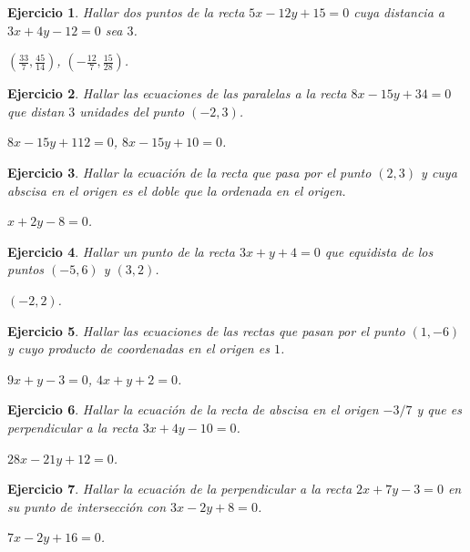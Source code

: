 \documentclass[12pt,a4paper]{article}
\newtheorem{ex}{Ejercicio}
\begin{document}
\begin{itemize}
\begin{ex}
Hallar dos puntos de la recta $5x - 12y + 15 = 0$ cuya distancia a $3x + 4y - 12 = 0$ sea $3$.
\begin{sol} $\left(\frac{33}{7}, \frac{45}{14}\right)$, $\left(-\frac{12}{7}, \frac{15}{28}\right)$. \end{sol}
\end{ex}

\begin{ex}
Hallar las ecuaciones de las paralelas a la recta $8x - 15y + 34 = 0$ que distan $3$ unidades del punto $(-2, 3)$.
\begin{sol} $8x - 15y + 112 = 0$, $8x - 15y + 10 = 0$. \end{sol}
\end{ex}

\begin{ex}
Hallar la ecuación de la recta que pasa por el punto $(2, 3)$ y cuya abscisa en el origen es el doble que la ordenada en el origen.
\begin{sol} $x + 2y - 8 = 0$. \end{sol}
\end{ex}

\begin{ex}
Hallar un punto de la recta $3x + y + 4 = 0$ que equidista de los puntos $(-5, 6)$ y $(3, 2)$.
\begin{sol} $(-2, 2)$. \end{sol}
\end{ex}

\begin{ex}
Hallar las ecuaciones de las rectas que pasan por el punto $(1, -6)$ y cuyo producto de coordenadas en el origen es $1$.
\begin{sol} $9x + y - 3 = 0$, $4x + y + 2 = 0$. \end{sol}
\end{ex}

\begin{ex}
Hallar la ecuación de la recta de abscisa en el origen $-3/7$ y que es perpendicular a la recta $3x + 4y - 10 = 0$.
\begin{sol} $28x - 21y + 12 = 0$. \end{sol}
\end{ex}

\begin{ex}
Hallar la ecuación de la perpendicular a la recta $2x + 7y - 3 = 0$ en su punto de intersección con $3x - 2y + 8 = 0$.
\begin{sol} $7x - 2y + 16 = 0$. \end{sol}
\end{ex}


\end{itemize}
\end{document}

